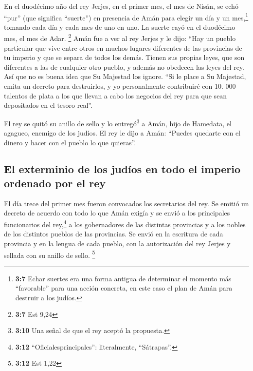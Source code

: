  En el duodécimo año del rey Jerjes, en el primer mes, el
mes de Nisán, se echó ``pur'' (que significa ``suerte'') en presencia de
Amán para elegir un día y un mes,\footnote{\textbf{3:7} Echar suertes
  era una forma antigua de determinar el momento más ``favorable'' para
  una acción concreta, en este caso el plan de Amán para destruir a los
  judíos.} tomando cada día y cada mes de uno en uno. La suerte cayó en
el duodécimo mes, el mes de Adar. \footnote{\textbf{3:7} Est 9,24}
 Amán fue a ver al rey Jerjes y le dijo: ``Hay un pueblo
particular que vive entre otros en muchos lugares diferentes de las
provincias de tu imperio y que se separa de todos los demás. Tienen sus
propias leyes, que son diferentes a las de cualquier otro pueblo, y
además no obedecen las leyes del rey. Así que no es buena idea que Su
Majestad los ignore.  ``Si le place a Su Majestad, emita
un decreto para destruirlos, y yo personalmente contribuiré con 10. 000
talentos de plata a los que llevan a cabo los negocios del rey para que
sean depositados en el tesoro real''.

 El rey se quitó su anillo de sello y lo
entregó\footnote{\textbf{3:10} Una señal de que el rey aceptó la
  propuesta.} a Amán, hijo de Hamedata, el agagueo, enemigo de los
judíos.  El rey le dijo a Amán: ``Puedes quedarte con el
dinero y hacer con el pueblo lo que quieras''.

\hypertarget{el-exterminio-de-los-juduxedos-en-todo-el-imperio-ordenado-por-el-rey}{%
\subsection{El exterminio de los judíos en todo el imperio ordenado por
el
rey}\label{el-exterminio-de-los-juduxedos-en-todo-el-imperio-ordenado-por-el-rey}}

 El día trece del primer mes fueron convocados los
secretarios del rey. Se emitió un decreto de acuerdo con todo lo que
Amán exigía y se envió a los principales funcionarios del
rey,\footnote{\textbf{3:12} ``Oficialesprincipales'': literalmente,
  ``Sátrapas''.} a los gobernadores de las distintas provincias y a los
nobles de los distintos pueblos de las provincias. Se envió en la
escritura de cada provincia y en la lengua de cada pueblo, con la
autorización del rey Jerjes y sellada con su anillo de sello.
\footnote{\textbf{3:12} Est 1,22}

